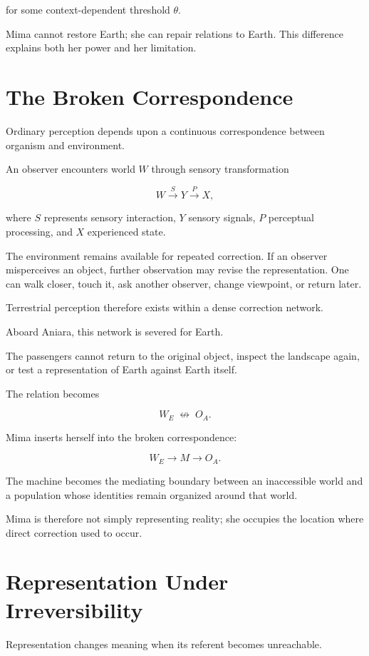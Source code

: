 \documentclass[11pt,oneside]{book}
\theoremstyle{definition}
\theoremstyle{remark}
\begin{document}
for some context-dependent threshold \(\theta\).

Mima cannot restore Earth; she can repair relations to Earth. This difference explains both her power and her limitation.

\section{The Broken Correspondence}

Ordinary perception depends upon a continuous correspondence between organism and environment.

An observer encounters world \(W\) through sensory transformation

\[
W
\xrightarrow{S}
Y
\xrightarrow{P}
X,
\]

where \(S\) represents sensory interaction, \(Y\) sensory signals, \(P\) perceptual processing, and \(X\) experienced state.

The environment remains available for repeated correction. If an observer misperceives an object, further observation may revise the representation. One can walk closer, touch it, ask another observer, change viewpoint, or return later.

Terrestrial perception therefore exists within a dense correction network.

Aboard Aniara, this network is severed for Earth.

The passengers cannot return to the original object, inspect the landscape again, or test a representation of Earth against Earth itself.

The relation becomes

\[
W_E
\;\not\longleftrightarrow\;
O_A.
\]

Mima inserts herself into the broken correspondence:

\[
W_E
\rightarrow
M
\rightarrow
O_A.
\]

The machine becomes the mediating boundary between an inaccessible world and a population whose identities remain organized around that world.

Mima is therefore not simply representing reality; she occupies the location where direct correction used to occur.

\section{Representation Under Irreversibility}

Representation changes meaning when its referent becomes unreachable.
\end{document}
